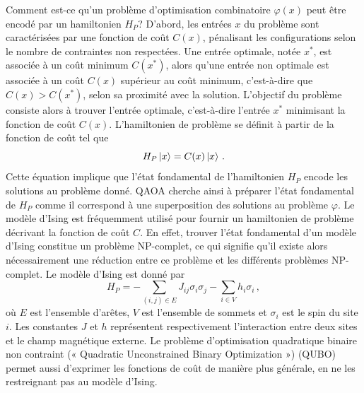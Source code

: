 Comment est-ce qu'un problème d'optimisation combinatoire $\varphi(x)$ peut être encodé par un hamiltonien $H_{P}$? D'abord, les entrées $x$ du problème sont caractérisées par une fonction de coût $C(x)$, pénalisant les configurations selon le nombre de contraintes non respectées. Une entrée optimale, notée $x^{*}$, est associée à un coût minimum $C(x^{*})$, alors qu'une entrée non optimale est associée à un coût $C(x)$ supérieur au coût minimum, c'est-à-dire que $C(x) > C(x^{*})$, selon sa proximité avec la solution. L'objectif du problème consiste alors à trouver l'entrée optimale, c'est-à-dire l'entrée $x^{*}$ minimisant la fonction de coût $C(x)$. L'hamiltonien de problème se définit à partir de la fonction de coût tel que
\begin{equation}
    H_{P} \ket{x} = C(x) \ket{x} \,.
\end{equation}
Cette équation implique que l'état fondamental de l'hamiltonien $H_{P}$ encode les solutions au problème donné. QAOA cherche ainsi à préparer l'état fondamental de $H_{P}$ comme il correspond à une superposition des solutions au problème $\varphi$. Le modèle d'Ising est fréquemment utilisé pour fournir un hamiltonien de problème décrivant la fonction de coût $C$. En effet, trouver l'état fondamental d'un modèle d'Ising constitue un problème \textsf{NP}-complet, ce qui signifie qu'il existe alors nécessairement une réduction entre ce problème et les différents problèmes \textsf{NP}-complet. Le modèle d'Ising est donné par
\begin{equation}
    \label{eq:hamiltonien-ising}
    H_P = - \sum_{(i,j) \in E} J_{ij} \sigma_i \sigma_j - \sum_{i \in V} h_i \sigma_i \,,
\end{equation}
où $E$ est l'ensemble d'arêtes, $V$ est l'ensemble de sommets et $\sigma_{i}$ est le spin du site $i$. Les constantes $J$ et $h$ représentent respectivement l'interaction entre deux sites et le champ magnétique externe. Le problème d'optimisation quadratique binaire non contraint (« Quadratic Unconstrained Binary Optimization ») (QUBO) permet aussi d'exprimer les fonctions de coût de manière plus générale, en ne les restreignant pas au modèle d'Ising.


